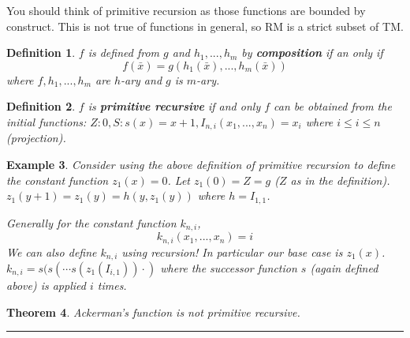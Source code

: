 \documentclass[twoside]{article}
\newcounter{lecnum}
\newtheorem{theorem}{Theorem}[lecnum]
\newtheorem{definition}[theorem]{Definition}
\newtheorem{example}[theorem]{Example}
\newenvironment{proof}{{\bf Proof:}}{\hfill\rule{2mm}{2mm}}
\begin{document}
You should think of primitive recursion as those functions are bounded by construct. This is not true of functions in general, so RM is  a strict subset of TM.

\begin{definition}
$f$ is defined from $g$ and $h_1, ..., h_m$ by \textbf{composition} if an only if 
\[f(\bar{x}) = g\left( h_1(\bar{x}), ..., h_m(\bar{x})\right)\]
where $f, h_1, ..., h_m$ are $h$-ary and $g$ is $m$-ary.
\end{definition}

\begin{definition}
$f$ is \textbf{primitive recursive} if and only $f$ can be obtained from the initial functions: $Z: 0, S: s(x) = x+1, I_{n,i}(x_1, ..., x_n) = x_i$ where $i\leq i\leq n$ (projection).
\end{definition}

\begin{example}
Consider using the above definition of primitive recursion to define the constant function $z_1(x) = 0$. Let $z_1(0) = Z = g$ ($Z$ as in the definition). $z_1(y+1) = z_1(y) = h(y, z_1(y))$ where $h = I_{1,1}$.

Generally for the constant function $k_{n,i}$, 
\[k_{n,i}(x_1, ..., x_n) = i \]
We can also define $k_{n,i}$ using recursion! In particular our base case is $z_1(x)$. $k_{n,i} = s(s(\cdots s(z_1(I_{i,1})) \cdot )$ where the successor function $s$ (again defined above) is applied $i$ times. 
\end{example}

\begin{theorem}
Ackerman's function is not primitive recursive.
\end{theorem}
\begin{proof}

\end{proof}
\end{document}
